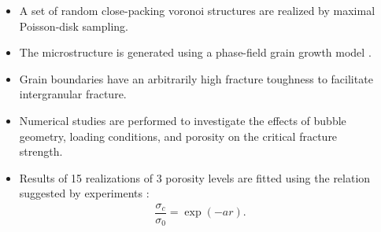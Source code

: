 \begin{frame}
\begin{columns}[T]
\begin{column}{0.6\textwidth}
    \end{column}
    \begin{column}{0.4\textwidth}
      \begin{itemize}
        \item A set of random close-packing voronoi structures are realized by maximal Poisson-disk sampling.
        \item The microstructure is generated using a phase-field grain growth model \cite{Moelans2008}.
        \item Grain boundaries have an arbitrarily high fracture toughness to facilitate intergranular fracture.
        \item Numerical studies are performed to investigate the effects of bubble geometry, loading conditions, and porosity on the critical fracture strength.
        \item Results of 15 realizations of 3 porosity levels are fitted using the relation suggested by experiments \cite{oguma_1982}:
              \begin{align*}
                \dfrac{\sigma_c}{\sigma_0} = \exp(-a r).
              \end{align*}
      \end{itemize}
    \end{column}
  \end{columns}
\end{frame}

